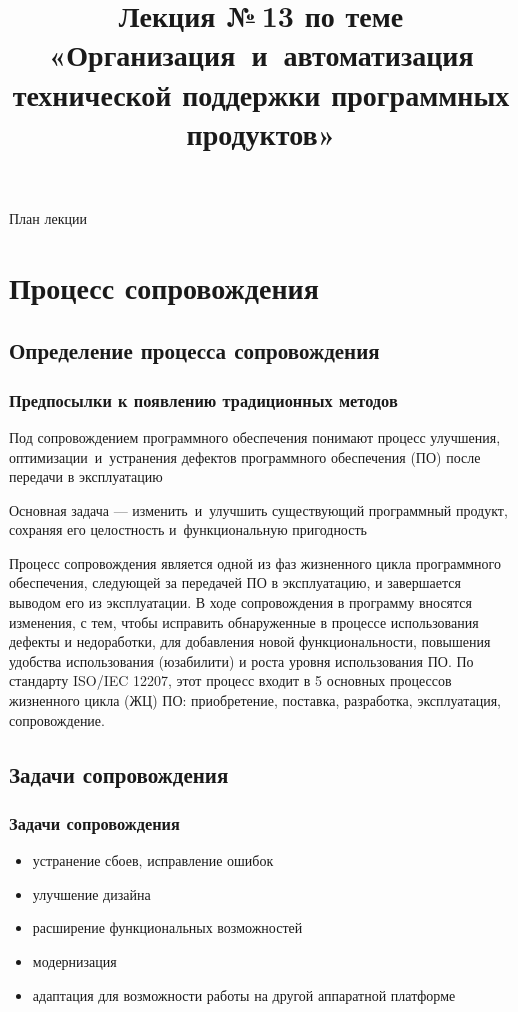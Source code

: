 \documentclass{../industrial-development}
\title{Лекция №\,13 по теме «Организация~и~автоматизация технической поддержки программных продуктов»}
\author{ }
\date{}
\begin{document}
\begin{frame}
  \titlepage
\end{frame}

\begin{frame}{План лекции}
  \tableofcontents
\end{frame}  

\section{Процесс сопровождения}
\subsection{Определение процесса сопровождения}


\begin{frame} \frametitle{Предпосылки к появлению традиционных методов}

	\begin{definition}
		\alert{Под сопровождением программного обеспечения} 
		 понимают процесс улучшения, оптимизации~и~устранения дефектов программного обеспечения (ПО) после передачи в эксплуатацию
	\end{definition}
	
	Основная задача --- изменить~и~улучшить существующий программный продукт, сохраняя его целостность и~функциональную пригодность
	
\end{frame}

\lecturenotes
Процесс сопровождения является одной из фаз жизненного цикла программного обеспечения, следующей за передачей ПО в эксплуатацию, и завершается выводом его из эксплуатации. В ходе сопровождения в программу вносятся изменения, с тем, чтобы исправить обнаруженные в процессе использования дефекты и недоработки, для добавления новой функциональности, повышения удобства использования (юзабилити) и роста уровня использования ПО. По стандарту ISO/IEC 12207, этот процесс входит в 5 основных процессов жизненного цикла (ЖЦ) ПО: приобретение, поставка, разработка, эксплуатация, сопровождение. 


\subsection{Задачи сопровождения}
\begin{frame} \frametitle{Задачи сопровождения}
	\begin{itemize}
		\item устранение сбоев, исправление ошибок
		\item улучшение дизайна 
		\item расширение функциональных возможностей 
		\item модернизация
		\item адаптация для возможности работы на другой аппаратной платформе
	\end{itemize}
\end{frame}
\end{document}
